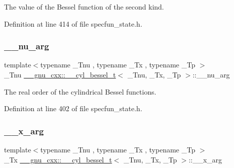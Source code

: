 The value of the Bessel function of the second kind. 



Definition at line 414 of file specfun\+\_\+state.\+h.

\mbox{\label{struct____gnu__cxx_1_1____cyl__bessel__t_a3d17d7f7196d7aef725228cf02269195}} 
\subsubsection{\texorpdfstring{\+\_\+\+\_\+nu\+\_\+arg}{\_\_nu\_arg}}
{\footnotesize\ttfamily template$<$typename \+\_\+\+Tnu , typename \+\_\+\+Tx , typename \+\_\+\+Tp $>$ \\
\+\_\+\+Tnu \hyperlink{struct____gnu__cxx_1_1____cyl__bessel__t}{\+\_\+\+\_\+gnu\+\_\+cxx\+::\+\_\+\+\_\+cyl\+\_\+bessel\+\_\+t}$<$ \+\_\+\+Tnu, \+\_\+\+Tx, \+\_\+\+Tp $>$\+::\+\_\+\+\_\+nu\+\_\+arg}



The real order of the cylindrical Bessel functions. 



Definition at line 402 of file specfun\+\_\+state.\+h.

\mbox{\label{struct____gnu__cxx_1_1____cyl__bessel__t_aac526f7bf86ebf0201e46545d9927f15}} 
\subsubsection{\texorpdfstring{\+\_\+\+\_\+x\+\_\+arg}{\_\_x\_arg}}
{\footnotesize\ttfamily template$<$typename \+\_\+\+Tnu , typename \+\_\+\+Tx , typename \+\_\+\+Tp $>$ \\
\+\_\+\+Tx \hyperlink{struct____gnu__cxx_1_1____cyl__bessel__t}{\+\_\+\+\_\+gnu\+\_\+cxx\+::\+\_\+\+\_\+cyl\+\_\+bessel\+\_\+t}$<$ \+\_\+\+Tnu, \+\_\+\+Tx, \+\_\+\+Tp $>$\+::\+\_\+\+\_\+x\+\_\+arg}



